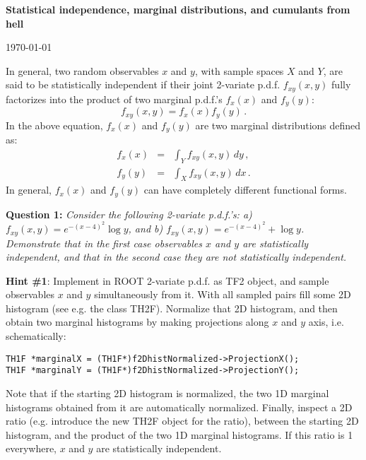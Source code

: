 \documentclass[11pt]{article}
\begin{document}
\begin{center}
\Large{\bf{Statistical independence, marginal distributions, and cumulants from hell}}\\
\end{center}
\begin{center}
{\small\today}
\end{center}

\bigskip

In general, two random observables $x$ and $y$, with sample spaces $X$ and $Y$, are said to be statistically independent if their joint 2-variate p.d.f. $f_{xy}(x,y)$ fully factorizes into the product of two marginal p.d.f.'s $f_{x}(x)$ and $f_{y}(y)$:  
%
\begin{equation}
f_{xy}(x,y) = f_{x}(x)f_{y}(y)\,.
\end{equation}
%
In the above equation, $f_{x}(x)$ and $f_{y}(y)$ are two marginal distributions defined as:
% 
\begin{eqnarray}
f_x(x) &=& \int_Y f_{xy}(x,y)\,dy\,,\nonumber\\
f_y(y) &=& \int_X f_{xy}(x,y)\,dx\,.
\label{eq:marginalizedPDFs}
\end{eqnarray}
%
In general, $f_{x}(x)$ and $f_{y}(y)$ can have completely different functional forms. 

\bigskip\bigskip\bigskip

\noindent\textbf{Question 1:} {\it Consider the following 2-variate p.d.f.'s: a) $f_{xy}(x,y) = e^{-(x-4)^2}\log y$, and b) $f_{xy}(x,y) = e^{-(x-4)^2}+\log y$. Demonstrate that in the first case observables $x$ and $y$ are statistically independent, and that in the second case they are not statistically independent.}
	
\bigskip

\noindent\textbf{Hint \#1}: Implement in ROOT 2-variate p.d.f. as TF2 object, and sample observables $x$ and $y$ simultaneously from it. With all sampled pairs fill some 2D histogram (see e.g. the class TH2F). Normalize that 2D histogram, and then obtain two marginal histograms by making projections along $x$ and $y$ axis, i.e. schematically: 
{\small
%
\begin{verbatim}
TH1F *marginalX = (TH1F*)f2DhistNormalized->ProjectionX();
TH1F *marginalY = (TH1F*)f2DhistNormalized->ProjectionY();
\end{verbatim}
%
}
\noindent Note that if the starting 2D histogram is normalized, the two 1D marginal histograms obtained from it are automatically normalized. Finally, inspect a 2D ratio (e.g. introduce the new TH2F object for the ratio), between the starting 2D histogram, and the product of the two 1D marginal histograms. If this ratio is 1 everywhere, $x$ and $y$ are statistically independent.
\end{document}
